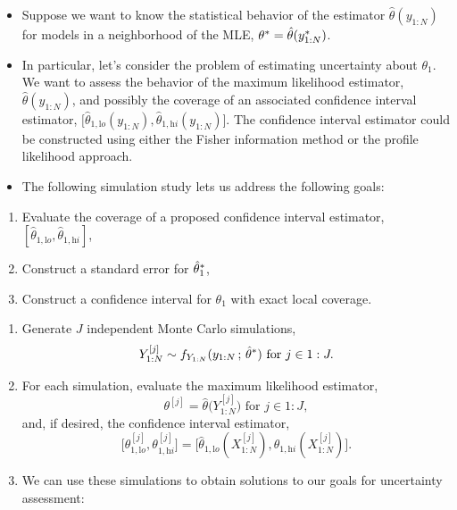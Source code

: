 \documentclass[]{article}
\providecommand{\tightlist}{%
  \setlength{\itemsep}{0pt}\setlength{\parskip}{0pt}}
\begin{document}
\begin{itemize}
\item
  Suppose we want to know the statistical behavior of the estimator
  \(\hat\theta({y_{1:N}})\) for models in a neighborhood of the MLE,
  \(\theta^*=\hat\theta(y_{1:N}^*)\).
\item
  In particular, let's consider the problem of estimating uncertainty
  about \(\theta_1\). We want to assess the behavior of the maximum
  likelihood estimator, \(\hat\theta({y_{1:N}})\), and possibly the
  coverage of an associated confidence interval estimator,
  \(\big[\hat\theta_{1,\mathrm lo}({y_{1:N}}),\hat\theta_{1,\mathrm hi}({y_{1:N}})\big]\).
  The confidence interval estimator could be constructed using either
  the Fisher information method or the profile likelihood approach.
\item
  The following simulation study lets us address the following goals: 
\end{itemize}

\begin{enumerate}
\def\labelenumi{(\Alph{enumi})}
\tightlist
\item
  Evaluate the coverage of a proposed confidence interval estimator,
  \([\hat\theta_{1,\mathrm lo},\hat\theta_{1,\mathrm hi}]\), 
\item
  Construct a standard error for \(\hat\theta_1^*\), 
\item
  Construct a confidence interval for \(\theta_1\) with exact local
  coverage.
\end{enumerate}

\begin{enumerate}
\def\labelenumi{\arabic{enumi}.}
\item
  Generate \(J\) independent Monte Carlo simulations,
  \[Y_{1:N}^{[j]} \sim f_{Y_{1:N}}(y_{1:N}\, ; \,\hat\theta^*)\mbox{ for } j\in 1:J.\]
\item
  For each simulation, evaluate the maximum likelihood estimator,
  \[ \theta^{[j]} = \hat\theta\big(Y_{1:N}^{[j]}\big)\mbox{ for } j\in 1:J,\]
  and, if desired, the confidence interval estimator,
  \[ \big[\theta^{[j]}_{1,\mathrm lo},\theta^{[j]}_{1,\mathrm hi}\big] = \big[\hat\theta_{1,\mathrm lo}({X^{[j]}_{1:N}}),\hat\theta_{1,\mathrm hi}({X^{[j]}_{1:N}})\big].\]
\item
  We can use these simulations to obtain solutions to our goals for
  uncertainty assessment: 
\end{enumerate}
\end{document}
